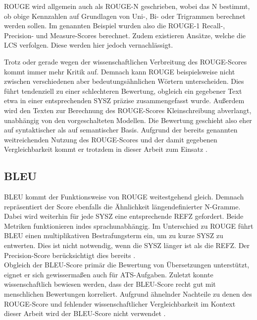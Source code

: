 \noindent
\ac{ROUGE} wird allgemein auch als \ac{ROUGE}-N geschrieben, wobei das N bestimmt, ob obige Kennzahlen auf Grundlagen von Uni-, Bi- oder Trigrammen berechnet werden sollen. Im genannten Beispiel wurden also die \ac{ROUGE}-1 Recall-, Precision- und Measure-Scores berechnet. Zudem existieren Ansätze, welche die \ac{LCS} verfolgen. Diese werden hier jedoch vernachlässigt.
\newpage

\noindent
Trotz oder gerade wegen der wissenschaftlichen Verbreitung des \ac{ROUGE}-Scores kommt immer mehr Kritik auf. Demnach kann \ac{ROUGE} beispielsweise nicht zwischen verschiedenen aber bedeutungsähnlichen Wörtern unterscheiden. Dies führt tendenziell zu einer schlechteren Bewertung, obgleich ein gegebener Text etwa in einer entsprechenden \ac{SYSZ} präzise zusammengefasst wurde. Außerdem wird den Texten zur Berechnung des \ac{ROUGE}-Scores Kleinschreibung abverlangt, unabhängig von den vorgeschalteten Modellen. Die Bewertung geschieht also eher auf syntaktischer als auf semantischer Basis. Aufgrund der bereits genannten weitreichenden Nutzung des \ac{ROUGE}-Scores und der damit gegebenen Vergleichbarkeit kommt er trotzdem in dieser Arbeit zum Einsatz \cite[S.~5]{LIN04}.

	
\subsection{BLEU}
\noindent
\ac{BLEU} kommt der Funktionsweise von \ac{ROUGE} weitestgehend gleich. Demnach repräsentiert der Score ebenfalls die Ähnlichkeit längendefinierter N-Gramme. Dabei wird weiterhin für jede \ac{SYSZ} eine entsprechende \ac{REFZ} gefordert. Beide Metriken funktionieren indes sprachunabhängig. Im Unterschied zu \ac{ROUGE} führt \ac{BLEU} einen multiplikativen Bestrafungsterm ein, um zu kurze \ac{SYSZ} zu entwerten. Dies ist nicht notwendig, wenn die \ac{SYSZ} länger ist als die \ac{REFZ}. Der Precision-Score berücksichtigt dies bereits \cite[S.~5]{PAP02}.\\

\noindent
Obgleich der \ac{BLEU}-Score primär die Bewertung von Übersetzungen unterstützt, eignet er sich gewissermaßen auch für \ac{ATS}-Aufgaben. Zuletzt konnte wissenschaftlich bewiesen werden, dass der \ac{BLEU}-Score recht gut mit menschlichen Bewertungen korreliert. Aufgrund ähnelnder Nachteile zu denen des \ac{ROUGE}-Score und fehlender wissenschaftlicher Vergleichbarkeit im Kontext dieser Arbeit wird der \ac{BLEU}-Score nicht verwendet \cite[S.~6-7]{PAP02}.
